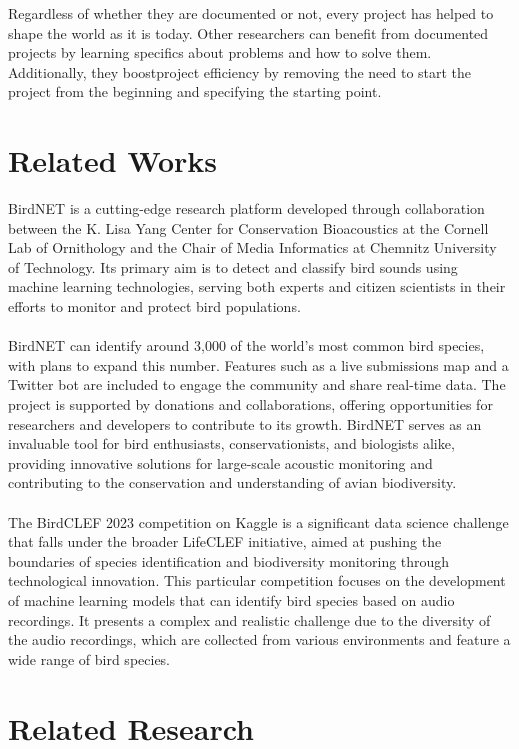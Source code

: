 Regardless of whether they are documented or not, every project has helped to shape the world as it is today.
Other researchers can benefit from documented projects by learning specifics about problems and how to solve
them. Additionally, they boostproject efficiency by removing the need to start the project from the beginning 
and specifying the starting point.

\section{Related Works}
BirdNET is a cutting-edge research platform developed through collaboration between the K. Lisa Yang Center for Conservation Bioacoustics at the Cornell Lab of Ornithology and the Chair of Media Informatics at Chemnitz University of Technology. Its primary aim is to detect and classify bird sounds using machine learning technologies, serving both experts and citizen scientists in their efforts to monitor and protect bird populations.\\\\
BirdNET can identify around 3,000 of the world's most common bird species, with plans to expand this number. Features such as a live submissions map and a Twitter bot are included to engage the community and share real-time data. The project is supported by donations and collaborations, offering opportunities for researchers and developers to contribute to its growth. BirdNET serves as an invaluable tool for bird enthusiasts, conservationists, and biologists alike, providing innovative solutions for large-scale acoustic monitoring and contributing to the conservation and understanding of avian biodiversity.\\\\
The BirdCLEF 2023 competition on Kaggle is a significant data science challenge that falls under the broader LifeCLEF initiative, aimed at pushing the boundaries of species identification and biodiversity monitoring through technological innovation. This particular competition focuses on the development of machine learning models that can identify bird species based on audio recordings. It presents a complex and realistic challenge due to the diversity of the audio recordings, which are collected from various environments and feature a wide range of bird species.
\section{Related Research}

